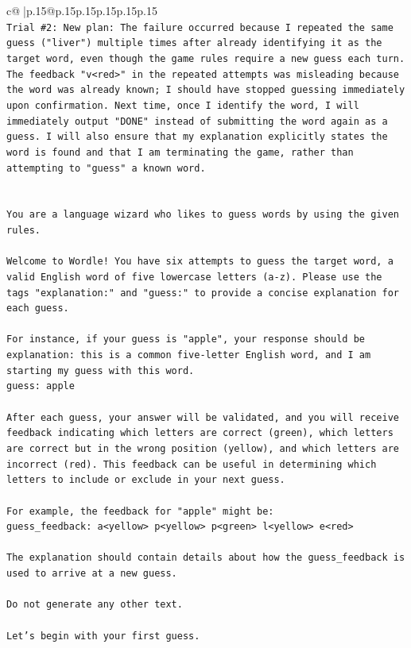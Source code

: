\documentclass{article}
\begin{document}
{\begin{supertabular}{c@{$\;$}|p{.15\linewidth}@{}p{.15\linewidth}p{.15\linewidth}p{.15\linewidth}p{.15\linewidth}p{.15\linewidth}}
{{{\\ 
\texttt{Trial \#2: New plan: The failure occurred because I repeated the same guess ("liver") multiple times after already identifying it as the target word, even though the game rules require a new guess each turn. The feedback "v<red>" in the repeated attempts was misleading because the word was already known; I should have stopped guessing immediately upon confirmation. Next time, once I identify the word, I will immediately output "DONE" instead of submitting the word again as a guess. I will also ensure that my explanation explicitly states the word is found and that I am terminating the game, rather than attempting to "guess" a known word.} \\
\\ 
\\ 
\texttt{You are a language wizard who likes to guess words by using the given rules.} \\
\\ 
\texttt{Welcome to Wordle! You have six attempts to guess the target word, a valid English word of five lowercase letters (a{-}z). Please use the tags "explanation:" and "guess:" to provide a concise explanation for each guess.} \\
\\ 
\texttt{For instance, if your guess is "apple", your response should be} \\
\texttt{explanation: this is a common five{-}letter English word, and I am starting my guess with this word.} \\
\texttt{guess: apple} \\
\\ 
\texttt{After each guess, your answer will be validated, and you will receive feedback indicating which letters are correct (green), which letters are correct but in the wrong position (yellow), and which letters are incorrect (red). This feedback can be useful in determining which letters to include or exclude in your next guess.} \\
\\ 
\texttt{For example, the feedback for "apple" might be:} \\
\texttt{guess\_feedback: a<yellow> p<yellow> p<green> l<yellow> e<red>} \\
\\ 
\texttt{The explanation should contain details about how the guess\_feedback is used to arrive at a new guess.} \\
\\ 
\texttt{Do not generate any other text.} \\
\\ 
\texttt{Let's begin with your first guess.} \\
            }
        }
    }
     \\ \\


\end{supertabular}}
\end{document}
